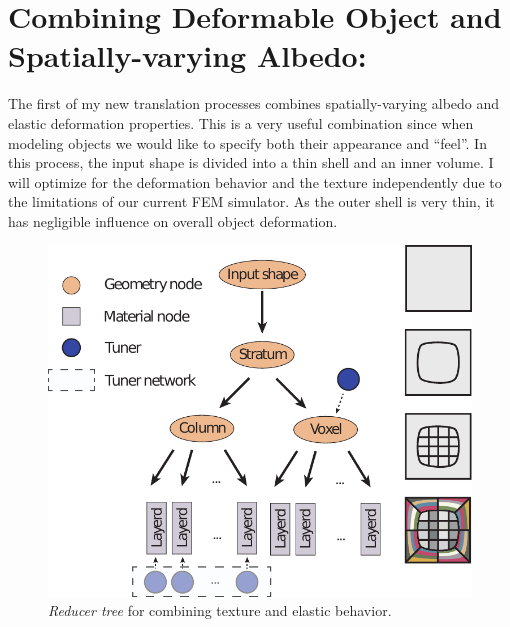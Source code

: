 \section{Combining Deformable Object and Spatially-varying Albedo:}
The first of my new translation processes combines spatially-varying albedo and elastic deformation properties.
This is a very useful combination since when modeling objects we would like to specify both their appearance and ``feel''.
In this process, the input shape is divided into a thin shell and an inner volume.
I will optimize for the deformation behavior and the texture independently due to the limitations of our current FEM simulator.
As the outer shell is very thin, it has negligible influence on overall object deformation.
\begin{figure}
\centering
\includegraphics[scale=0.7]{figure/treeTexDef.pdf}
\caption {\emph{Reducer tree} for combining texture and elastic behavior.
}
\label{fig:treeDeform}
\end{figure}

